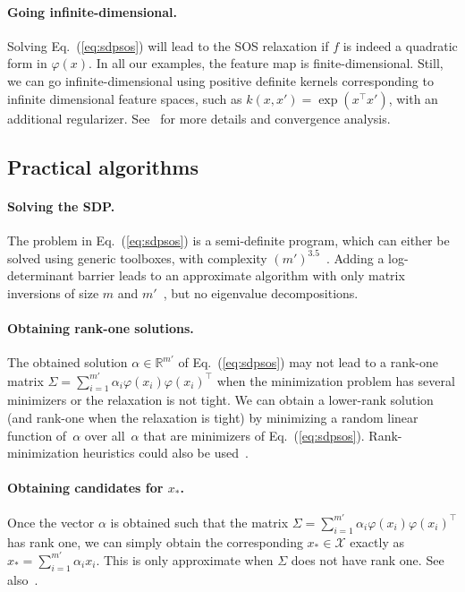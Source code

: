 \documentclass[11pt]{article}
\newcommand{\rb}{\mathbb{R}}
\newcommand{\eq}[1]{Eq.~(\ref{eq:#1})}
\def \X{{\mathcal X}}
\begin{document}
  
  \paragraph{Going infinite-dimensional.} Solving \eq{sdpsos} will lead to the SOS relaxation if $f$ is indeed a quadratic form in $\varphi(x)$. In all our examples, the feature map is finite-dimensional. Still, we can go infinite-dimensional using positive definite kernels corresponding to infinite dimensional feature spaces, such as $k(x,x') = \exp( x^\top x')$, with an additional regularizer. See~\cite{rudi2020finding} for more details and convergence analysis.
   
   \subsection{Practical algorithms}
\label{sec:practical}
\paragraph{Solving the SDP.}   The problem in \eq{sdpsos} is a semi-definite program, which can either be solved using generic toolboxes, with complexity $(m')^{3.5}$~\cite{helmberg1996interior}. Adding a log-determinant barrier leads to an approximate algorithm with only matrix inversions of size $m$ and $m'$~\cite{rudi2020finding}, but no eigenvalue decompositions.

   
\paragraph{Obtaining rank-one solutions.}
   The obtained solution $\alpha \in \rb^{m'}$ of \eq{sdpsos} may not lead to a rank-one matrix $  \Sigma = \sum_{i=1}^{m'} \alpha_i \varphi(x_i) \varphi(x_i)^\top$
   when the minimization problem has several minimizers or the relaxation is not tight. We can obtain a lower-rank solution (and rank-one when the relaxation is tight) by minimizing a random linear function of~$\alpha$ over all~$\alpha$ that are minimizers of \eq{sdpsos}. Rank-minimization heuristics could also be used~\cite{fazel2001rank}.
   
   
\paragraph{Obtaining candidates for $x_\ast$.} Once the vector $\alpha$ is obtained such that the matrix $\Sigma = \sum_{i=1}^{m'} \alpha_i \varphi(x_i) \varphi(x_i)^\top$ has rank one, we can simply obtain the corresponding $x_\ast \in \X$ exactly as $x_\ast = \sum_{i=1}^{m'} \alpha_i x_i$. This is only approximate when $\Sigma$ does not have rank one.
See also~\cite{henrion2005detecting}.
  
\end{document}
